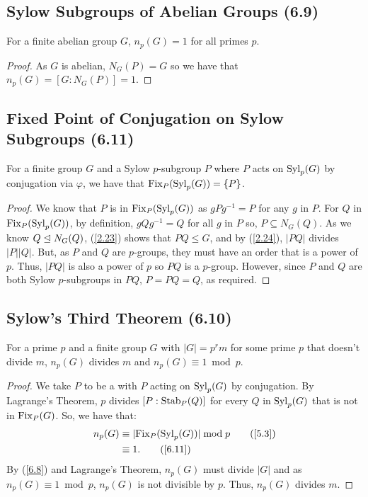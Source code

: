 \subsection{Sylow Subgroups of Abelian Groups (6.9)} \label{6.9}

For a finite abelian group $G$, $n_p(G) = 1$ for all primes $p$.

\begin{proof}
    As $G$ is abelian, $N_G(P) = G$ so we have that $n_p(G) = [G : N_G(P)] = 1$.
\end{proof}

\subsection{Fixed Point of Conjugation on Sylow Subgroups (6.11)} \label{6.11}

For a finite group $G$ and a Sylow $p$-subgroup $P$
where $P$ acts on $\operatorname{Syl}_p(G)$ by conjugation via $\varphi$,
we have that $\operatorname{Fix}_P(\operatorname{Syl}_p(G)) = \{P\}$.

\begin{proof}
    We know that $P$ is in $\operatorname{Fix}_P(\operatorname{Syl}_p(G))$ as $gPg^{-1} = P$
    for any $g$ in $P$. For $Q$ in $\operatorname{Fix}_P(\operatorname{Syl}_p(G))$,
    by definition, $gQg^{-1} = Q$ for all $g$ in $P$ so,
    $P \subseteq N_G(Q)$. As we know $Q \trianglelefteq N_G(Q)$, (\ref{2.23})
    shows that $PQ \leq G$, and by (\ref{2.24}), $|PQ|$ divides $|P||Q|$.
    But, as $P$ and $Q$ are $p$-groups, they must have an order
    that is a power of $p$. Thus, $|PQ|$ is also a power of $p$
    so $PQ$ is a $p$-group. However, since $P$ and $Q$ are both
    Sylow $p$-subgroups in $PQ$, $P = PQ = Q$, as required.
\end{proof}

\subsection{Sylow's Third Theorem (6.10)} \label{6.10}

For a prime $p$ and a finite group $G$ with
$|G| = p^rm$ for some prime $p$ that doesn't divide $m$, 
$n_p(G)$ divides $m$ and $n_p(G) \equiv 1 \bmod p$.

\begin{proof}
    We take $P$ to be a \Syls with $P$ acting on $\operatorname{Syl}_p(G)$
    by conjugation. By Lagrange's Theorem, $p$ divides $[P : \operatorname{Stab}_P(Q)]$
    for every $Q$ in $\operatorname{Syl}_p(G)$ that is not in $\operatorname{Fix}_P(G)$. So, we have that: \begin{align*}
        n_p(G) 
        &\equiv |\!\Fix_P(\Syl_p(G))| \bmod p \tag{\ref{5.3}} \\
        &\equiv 1. \tag{\ref{6.11}}
    \end{align*} By (\ref{6.8}) and Lagrange's Theorem, $n_p(G)$ must divide $|G|$
    and as $n_p(G) \equiv 1 \bmod p$, $n_p(G)$ is not divisible by $p$. Thus, 
    $n_p(G)$ divides $m$.
\end{proof}
